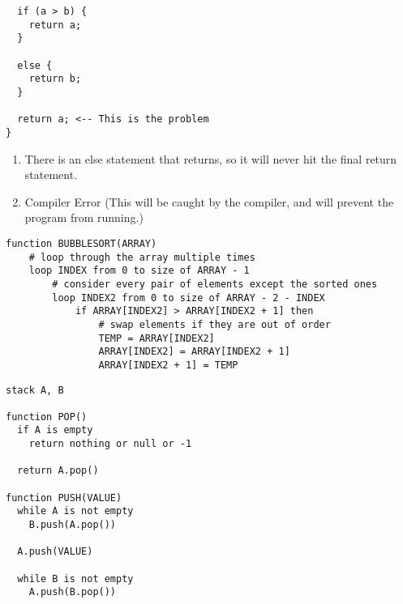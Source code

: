 \documentclass[11pt,addpoints]{exam}
\begin{document}
\begin{questions}
\begin{minipage}{\textwidth}
\begin{verbatim}
  if (a > b) {
    return a;
  }

  else {
    return b;
  }

  return a; <-- This is the problem
}
\end{verbatim}

\begin{enumerate}[label=(\alph*)]
  \item There is an else statement that returns, so it will never hit the final return statement.
  \item Compiler Error (This will be caught by the compiler, and will prevent the program from running.)
\end{enumerate}

\end{minipage}


\begin{verbatim}
function BUBBLESORT(ARRAY)							            
    # loop through the array multiple times
    loop INDEX from 0 to size of ARRAY - 1					    
        # consider every pair of elements except the sorted ones
        loop INDEX2 from 0 to size of ARRAY - 2 - INDEX			
            if ARRAY[INDEX2] > ARRAY[INDEX2 + 1] then			
                # swap elements if they are out of order
                TEMP = ARRAY[INDEX2]						    
                ARRAY[INDEX2] = ARRAY[INDEX2 + 1]				
                ARRAY[INDEX2 + 1] = TEMP					    
\end{verbatim}


\begin{verbatim}
stack A, B

function POP()
  if A is empty
    return nothing or null or -1

  return A.pop()

function PUSH(VALUE)
  while A is not empty
    B.push(A.pop())

  A.push(VALUE)

  while B is not empty
    A.push(B.pop())

\end{verbatim}




\end{questions}
\end{document}

